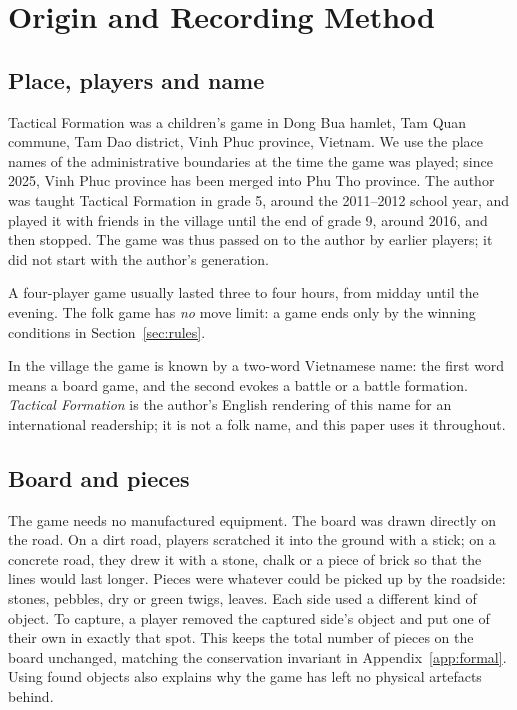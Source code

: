 \section{Origin and Recording Method}
\label{sec:provenance}

\subsection{Place, players and name}

Tactical Formation was a children's game in Dong Bua hamlet, Tam Quan commune, Tam Dao
district, Vinh Phuc province, Vietnam. We use the place names of the
administrative boundaries at the time the game was played; since 2025,
Vinh Phuc province has been merged into Phu Tho province. The author was
taught Tactical Formation in grade 5, around the 2011--2012 school year, and played it
with friends in the village until the end of grade 9, around 2016, and then
stopped. The game was thus passed on to the author by earlier players; it
did not start with the author's generation.

A four-player game usually lasted three to four hours, from midday until
the evening. The folk game has \emph{no} move limit: a game ends only by the
winning conditions in Section~\ref{sec:rules}.

In the village the game is known by a two-word Vietnamese name: the first
word means a board game, and the second evokes a battle or a battle
formation. \emph{Tactical Formation} is the author's English rendering of
this name for an international readership; it is not a folk name, and this
paper uses it throughout.

\subsection{Board and pieces}

The game needs no manufactured equipment. The board was drawn directly on the
road. On a dirt road, players scratched it into the ground with a
stick; on a concrete road, they drew it with a stone, chalk or a piece of
brick so that the lines would last longer. Pieces were whatever could be
picked up by the roadside: stones, pebbles, dry or green twigs, leaves.
Each side used a different kind of object. To capture, a player removed the
captured side's object and put one of their own in exactly that spot. This
keeps the total number of pieces on the board unchanged, matching the
conservation invariant in Appendix~\ref{app:formal}. Using found objects also
explains why the game has left no physical artefacts behind.

